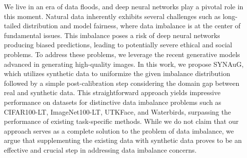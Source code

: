 
We live in an era of data floods, and deep neural networks play a pivotal role in this moment.
Natural data inherently exhibits several challenges such as long-tailed distribution and model fairness, where data imbalance is at the center of fundamental issues.
This imbalance poses a risk of deep neural networks producing biased predictions, leading to potentially severe ethical and social problems.
To address these problems, we leverage the recent generative models advanced in generating high-quality images.
In this work, we propose SYNAuG, which utilizes synthetic data to uniformize the given imbalance distribution followed by a simple post-calibration step considering the domain gap between real and synthetic data.
This straightforward approach yields impressive performance on datasets for distinctive data imbalance problems such as CIFAR100-LT, ImageNet100-LT, UTKFace, and Waterbirds, surpassing the performance of existing task-specific methods.
While we do not claim that our approach serves as a complete solution to the problem of data imbalance, we argue that supplementing the existing data with synthetic data proves to be an effective and crucial step in addressing data imbalance concerns.
